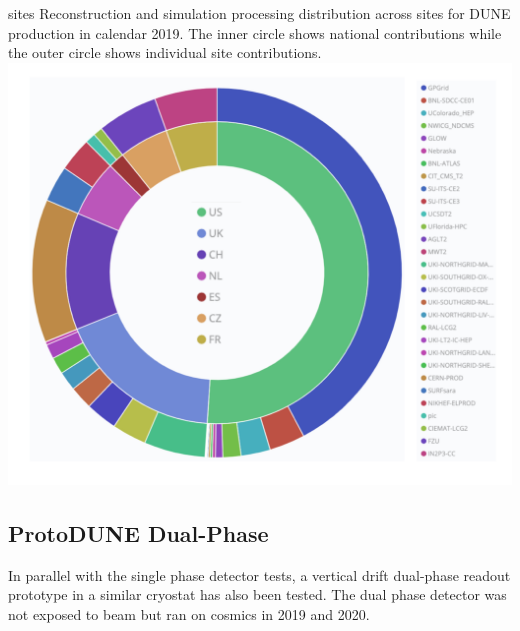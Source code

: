\documentclass[../main-v1.tex]{subfiles}
\begin{document}
\begin{dunefigure}
{sites} %
{Reconstruction and simulation processing distribution across sites for DUNE production in calendar 2019.  The inner circle shows national contributions while the outer circle shows individual site contributions.}
\includegraphics[height=0.65\textwidth]{graphics/IntroFigures/Fig_8.pdf}
\end{dunefigure}

\subsection{ProtoDUNE Dual-Phase}


In parallel with the single phase detector tests, a vertical drift  dual-phase readout prototype 
in a similar cryostat has also been tested.  The dual phase detector was not exposed to beam but ran on cosmics in 2019 and 2020. 
\end{document}
